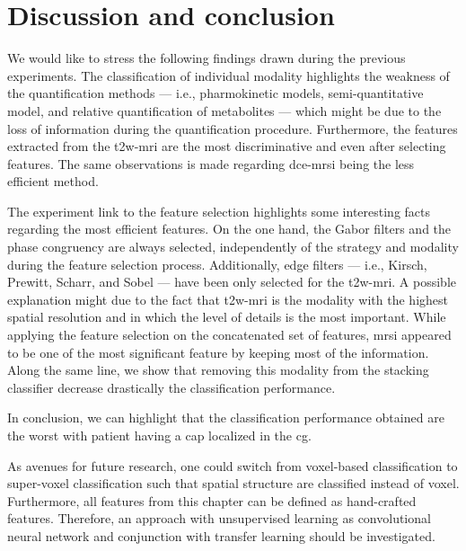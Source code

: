 \section{Discussion and conclusion}\label{sec:chp6:discussion}

We would like to stress the following findings drawn during the previous experiments.
The classification of individual modality highlights the weakness of the quantification methods --- i.e., pharmokinetic models, semi-quantitative model, and relative quantification of metabolites --- which might be due to the loss of information during the quantification procedure.
Furthermore, the features extracted from the \ac{t2w}-\ac{mri} are the most discriminative and even after selecting features.
The same observations is made regarding \ac{dce}-\ac{mrsi} being the less efficient method.

The experiment link to the feature selection highlights some interesting facts regarding the most efficient features.
On the one hand, the Gabor filters and the phase congruency are always selected, independently of the strategy and modality during the feature selection process.
Additionally, edge filters --- i.e., Kirsch, Prewitt, Scharr, and Sobel --- have been only selected for the \ac{t2w}-\ac{mri}.
A possible explanation might due to the fact that \ac{t2w}-\ac{mri} is the modality with the highest spatial resolution and in which the level of details is the most important.
While applying the feature selection on the concatenated set of features, \ac{mrsi} appeared to be one of the most significant feature by keeping most of the information.
Along the same line, we show that removing this modality from the stacking classifier decrease drastically the classification performance.

In conclusion, we can highlight that the classification performance obtained are the worst with patient having a \ac{cap} localized in the \ac{cg}. 

As avenues for future research, one could switch from voxel-based classification to super-voxel classification such that spatial structure are classified instead of voxel.
Furthermore, all features from this chapter can be defined as hand-crafted features.
Therefore, an approach with unsupervised learning as convolutional neural network and conjunction with transfer learning should be investigated.

